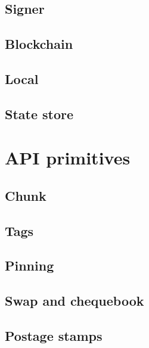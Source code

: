 \subsection{Signer}\label{spec:api:signer}
% 

\subsection{Blockchain \statusred}\label{spec:api:blockchain}
% 

\subsection{Local \statusred}\label{spec:api:local}
% 

\subsection{State store \statusred}\label{spec:api:statestore}
% 



\section{API primitives}\label{spec:api:primitives}

\subsection{Chunk \statusred}\label{spec:api:chunkx}
% 

\subsection{Tags \statusred}\label{spec:api:tags}


\subsection{Pinning
\statusorange}\label{spec:api:pinning}


\subsection{Swap and chequebook\statusorange}\label{spec:api:swap}


\subsection{Postage stamps \statusorange}\label{spec:api:postage}


